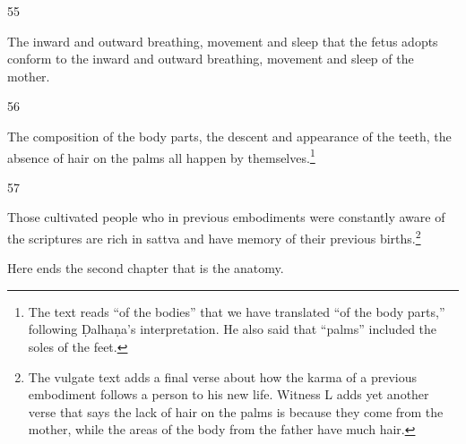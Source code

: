 \begin{translation}
\item[55]

The inward and outward breathing, movement and sleep that the fetus adopts
conform to the  inward and outward breathing, movement and 
sleep of the mother.

\item[56]

The composition of the body parts, the descent and appearance of the
teeth, the absence of hair on the palms all happen by
themselves.\footnote{The text reads  “of the bodies”
    that we have translated “of the body parts,” following Ḍalhaṇa's
    interpretation.  He also said that “palms” included the soles of the
    feet.}

\item[57]

Those cultivated people who in previous embodiments were constantly
aware of the scriptures are rich in sattva and have
memory of their previous births.\footnote{The vulgate text adds
    a final verse about how the karma of a previous embodiment 
    follows a person to his new life.  Witness L adds yet another verse 
    that says the lack of hair on the palms is because they come from the 
    mother, while the areas of the body from the father have much hair.}
    
\bigskip

Here ends the second chapter that is the anatomy.
    
%
%
%
%
%
%
%  

\end{translation}
